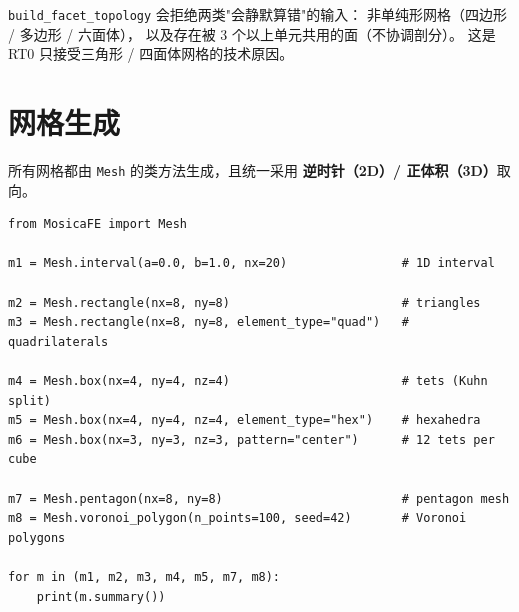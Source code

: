 \documentclass[UTF8,11pt,oneside]{ctexbook}
\theoremstyle{definition}
\theoremstyle{plain}
\newenvironment{important}{%
  \begin{tcolorbox}[colback=blue!5,colframe=blue!45,title=要点,fonttitle=\bfseries]%
}{%
  \end{tcolorbox}%
}
\newcommand{\code}[1]{\texttt{#1}}
\begin{document}
\begin{important}
\code{build\_\allowbreak facet\_\allowbreak topology} 会拒绝两类"会静默算错"的输入：
非单纯形网格（四边形 / 多边形 / 六面体），
以及存在被 3 个以上单元共用的面（不协调剖分）。
这是 RT0 只接受三角形 / 四面体网格的技术原因。
\end{important}

\section{网格生成}
\label{sec:mesh-generation}

所有网格都由 \code{Mesh} 的类方法生成，且统一采用
\textbf{逆时针（2D）/ 正体积（3D）}取向。

\begin{lstlisting}[language=MosicaFE,caption={示例 4.1：生成各类网格},label={lst:meshgen}]
from MosicaFE import Mesh

m1 = Mesh.interval(a=0.0, b=1.0, nx=20)                # 1D interval

m2 = Mesh.rectangle(nx=8, ny=8)                        # triangles
m3 = Mesh.rectangle(nx=8, ny=8, element_type="quad")   # quadrilaterals

m4 = Mesh.box(nx=4, ny=4, nz=4)                        # tets (Kuhn split)
m5 = Mesh.box(nx=4, ny=4, nz=4, element_type="hex")    # hexahedra
m6 = Mesh.box(nx=3, ny=3, nz=3, pattern="center")      # 12 tets per cube

m7 = Mesh.pentagon(nx=8, ny=8)                         # pentagon mesh
m8 = Mesh.voronoi_polygon(n_points=100, seed=42)       # Voronoi polygons

for m in (m1, m2, m3, m4, m5, m7, m8):
    print(m.summary())
\end{lstlisting}
\end{document}
